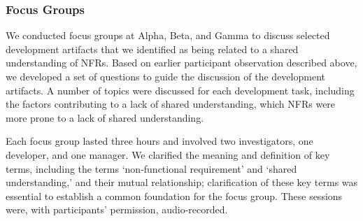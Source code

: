 \documentclass[smallextended]{svjour3}        %
\begin{document}
\subsubsection{Focus Groups}
We conducted focus groups at Alpha, Beta, and Gamma to discuss  
selected development artifacts that we identified as being related to a shared understanding of NFRs. 
Based on earlier participant observation described above, we developed a set of questions to guide the discussion of the development artifacts. 
A number of topics were discussed for each development task, including the factors contributing to a lack of shared understanding, which NFRs were more prone to a lack of shared understanding. 

Each focus group lasted three hours and involved two investigators, one developer, and one manager.
We clarified the meaning and definition of key terms, including the terms `non-functional requirement' and `shared understanding,'  
and their mutual relationship; clarification of these key terms was essential to establish a common foundation for the focus group.
These sessions were, with participants' permission, audio-recorded. 










\end{document}
